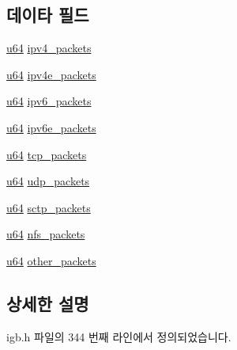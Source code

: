 \subsection*{데이타 필드}
\begin{DoxyCompactItemize}
\item 
\hyperlink{lib_2igb_2e1000__osdep_8h_a1d8f78f95a414480659f3182e6067b80}{u64} \hyperlink{structigb__rx__packet__stats_a3ff32dae64faebe642e2d889b76c294a}{ipv4\+\_\+packets}
\item 
\hyperlink{lib_2igb_2e1000__osdep_8h_a1d8f78f95a414480659f3182e6067b80}{u64} \hyperlink{structigb__rx__packet__stats_a781281956565ebe876de958881004048}{ipv4e\+\_\+packets}
\item 
\hyperlink{lib_2igb_2e1000__osdep_8h_a1d8f78f95a414480659f3182e6067b80}{u64} \hyperlink{structigb__rx__packet__stats_a714c0f76258e9051af35a08bdd71c0e0}{ipv6\+\_\+packets}
\item 
\hyperlink{lib_2igb_2e1000__osdep_8h_a1d8f78f95a414480659f3182e6067b80}{u64} \hyperlink{structigb__rx__packet__stats_a3c5fd454c267d00f8ee7d682c9ddafcf}{ipv6e\+\_\+packets}
\item 
\hyperlink{lib_2igb_2e1000__osdep_8h_a1d8f78f95a414480659f3182e6067b80}{u64} \hyperlink{structigb__rx__packet__stats_a51215069637ad3df438914021f4ee4c3}{tcp\+\_\+packets}
\item 
\hyperlink{lib_2igb_2e1000__osdep_8h_a1d8f78f95a414480659f3182e6067b80}{u64} \hyperlink{structigb__rx__packet__stats_a28e2e368567f7430ad6aea43652578ef}{udp\+\_\+packets}
\item 
\hyperlink{lib_2igb_2e1000__osdep_8h_a1d8f78f95a414480659f3182e6067b80}{u64} \hyperlink{structigb__rx__packet__stats_add2d5545573762497be65a5a43de54c5}{sctp\+\_\+packets}
\item 
\hyperlink{lib_2igb_2e1000__osdep_8h_a1d8f78f95a414480659f3182e6067b80}{u64} \hyperlink{structigb__rx__packet__stats_a281c97c88bbf24b2c1e516b8fb85218c}{nfs\+\_\+packets}
\item 
\hyperlink{lib_2igb_2e1000__osdep_8h_a1d8f78f95a414480659f3182e6067b80}{u64} \hyperlink{structigb__rx__packet__stats_a2936b2447c6a89d288f211865cdd25c2}{other\+\_\+packets}
\end{DoxyCompactItemize}


\subsection{상세한 설명}


igb.\+h 파일의 344 번째 라인에서 정의되었습니다.



